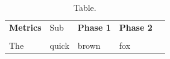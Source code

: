 \documentclass{article}
\begin{document}
\begin{table}[!h]
\caption{Table.}
\label{tab:task}
\begin{tabular}{|l|l|l|l|l|}
\hline
 \textbf{Metrics} & Sub & \textbf{Phase 1} & \textbf{Phase 2} \\
\hhline{|====|}
\multicolumn{4}{|c|}{1}\\
 \hhline{|====|}
The & quick & brown  & fox \\
\hline
\end{tabular}
\normalsize
\end{table}
\end{document}
